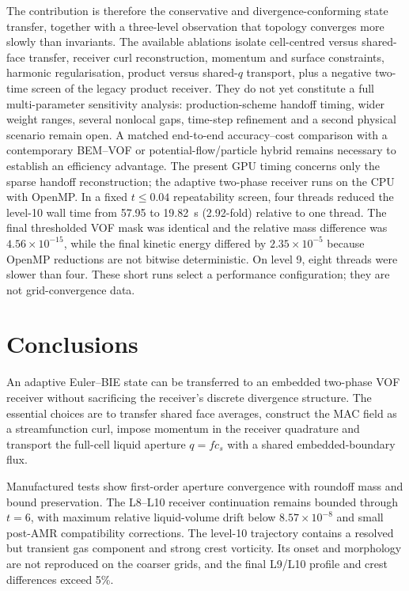\documentclass[11pt]{article}
\begin{document}
The contribution is therefore the conservative and divergence-conforming
state transfer, together with a three-level observation that topology
converges more slowly than invariants.  The available ablations isolate
cell-centred versus shared-face transfer, receiver curl reconstruction,
momentum and surface constraints, harmonic regularisation, product versus
shared-$q$ transport, plus a negative two-time screen of the legacy product
receiver.  They do not yet constitute a full multi-parameter sensitivity
analysis: production-scheme handoff timing, wider weight ranges, several
nonlocal gaps, time-step refinement and a second physical scenario remain
open.  A matched end-to-end accuracy--cost comparison with a
contemporary BEM--VOF or potential-flow/particle hybrid remains necessary to
establish an efficiency advantage.  The present GPU timing concerns only the
sparse handoff reconstruction; the adaptive two-phase receiver runs on the
CPU with OpenMP.  In a fixed $t\leq0.04$ repeatability screen, four threads
reduced the level-10 wall time from 57.95 to 19.82~s (2.92-fold) relative to
one thread.  The final thresholded VOF mask was identical and the relative
mass difference was $4.56\times10^{-15}$, while the final kinetic energy
differed by $2.35\times10^{-5}$ because OpenMP reductions are not bitwise
deterministic.  On level 9, eight threads were slower than four.  These short
runs select a performance configuration; they are not grid-convergence data.

\section{Conclusions}

An adaptive Euler--BIE state can be transferred to an embedded two-phase VOF
receiver without sacrificing the receiver's discrete divergence structure.
The essential choices are to transfer shared face averages, construct the MAC
field as a streamfunction curl, impose momentum in the receiver quadrature and
transport the full-cell liquid aperture $q=f c_s$ with a shared
embedded-boundary flux.

Manufactured tests show first-order aperture convergence with roundoff mass
and bound preservation.  The L8--L10 receiver continuation remains bounded through
$t=6$, with maximum relative liquid-volume drift below
$8.57\times10^{-8}$ and small post-AMR compatibility corrections.  The
level-10 trajectory contains a resolved but transient gas component and
strong crest vorticity.  Its onset and morphology are not reproduced on the
coarser grids, and the final L9/L10 profile and crest differences exceed 5\%.
\end{document}

